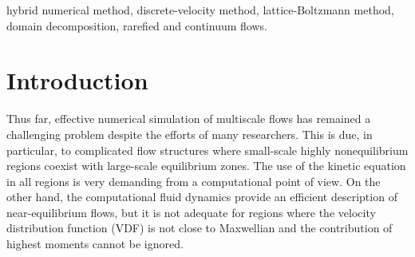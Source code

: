 \documentclass{elsarticle} %
\begin{document}
\begin{frontmatter}
\begin{abstract}
\end{abstract}

\begin{keyword}
hybrid numerical method,
discrete-velocity method,
lattice-Boltzmann method,
domain decomposition,
rarefied and continuum flows.
\end{keyword}

\end{frontmatter}


\section{Introduction}\label{sec:intro}

Thus far, effective numerical simulation of multiscale flows has remained a challenging problem despite the efforts of many researchers.
This is due, in particular, to complicated flow structures where small-scale highly nonequilibrium regions
coexist with large-scale equilibrium zones.
The use of the kinetic equation in all regions is very demanding from a computational point of view.
On the other hand, the computational fluid dynamics provide an efficient description of near-equilibrium flows,
but it is not adequate for regions where the velocity distribution function (VDF) is not close to Maxwellian
and the contribution of highest moments cannot be ignored.
\end{document}
